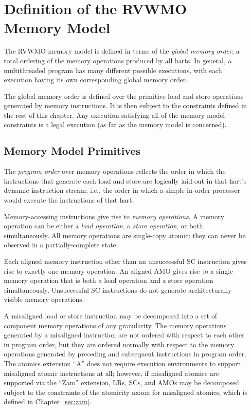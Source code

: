 \section{Definition of the RVWMO Memory Model}
\label{sec:rvwmo}

The RVWMO memory model is defined in terms of the {\em global memory order}, a total ordering of the memory operations produced by all harts.
In general, a multithreaded program has many different possible executions, with each execution having its own corresponding global memory order.

The global memory order is defined over the primitive load and store operations generated by memory instructions.
It is then subject to the constraints defined in the rest of this chapter.
Any execution satisfying all of the memory model constraints is a legal execution (as far as the memory model is concerned).

\subsection*{Memory Model Primitives}
\label{sec:rvwmo:primitives}
The {\em program order} over memory operations reflects the order in which the instructions that generate each load and store are logically laid out in that hart's dynamic instruction stream; i.e., the order in which a simple in-order processor would execute the instructions of that hart.

Memory-accessing instructions give rise to {\em memory operations}.
A memory operation can be either a {\em load operation}, a {\em store operation}, or both simultaneously.
All memory operations are single-copy atomic: they can never be observed in a partially-complete state.

Each aligned memory instruction other than an unsuccessful SC instruction gives rise to exactly one memory operation.
An aligned AMO gives rise to a single memory operation that is both a load operation and a store operation simultaneously.
Unsuccessful SC instructions do not generate architecturally-visible memory operations.

A misaligned load or store instruction may be decomposed into a set of component memory operations of any granularity.
The memory operations generated by a misaligned instruction are not ordered with respect to each other in program order, but they are ordered normally with respect to the memory operations generated by preceding and subsequent instructions in program order.
The atomics extension ``A'' does not require execution environments to support misaligned atomic instructions at all; however, if misaligned atomics are supported via the ``Zam'' extension, LRs, SCs, and AMOs may be decomposed subject to the constraints of the atomicity axiom for misaligned atomics, which is defined in Chapter~\ref{sec:zam}.

